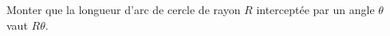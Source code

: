 \begin{exercice}\label{exoGeomAnal-0034}

    Monter que la longueur d'arc de cercle de rayon \( R\) interceptée par un angle \( \theta\) vaut \( R\theta\).

\end{exercice}
